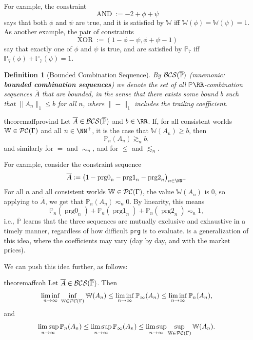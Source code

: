 \documentclass[authordate,onecolumn,noenvironments]{miri-tech-article}
\newtheorem{definition}[theorem]{Definition}
\numberwithin{equation}{subsection}
\newcommand{\seq}[1]{{\overline{#1}}}
\newcommand{\any}{-}
\newcommand{\nn}{n}
\newcommand{\pgenable}{\ensuremath{\MP}\text{-generable}\xspace}
\newcommand{\rparenthetical}[1]{\hfill\upshape{{\small (#1)}}} %
\newcommand{\proofin}[1]{\rparenthetical{Proof in:~#1.}}
\newcommand{\aff}{A}
\newcommand{\BCS}[1][\MP]{\mathcal{B\-C\-S}(#1)} %
\newcommand{\BelState}{\mathbb{P}}
\newcommand{\pt}{\BelState}
\newcommand{\MP}{\seq{\pt}}
\newcommand{\cworlds}{\mathcal{P\-C}} %
\newcommand{\World}{\mathbb{W}}
\newcommand{\Theory}{\Gamma}
\newcommand{\prgz}{\mathit{\operatorname{prg0}}}
\newcommand{\prgo}{\mathit{\operatorname{prg1}}}
\newcommand{\prgt}{\mathit{\operatorname{prg2}}}
\begin{document}
\noindent For example, the constraint
\[
  \operatorname{AND} := -2 + \phi + \psi
\]
says that both $\phi$ and $\psi$ are true, and it is satisfied by $\World$ iff $\World(\phi) = \World(\psi) = 1$. As another example, the pair of constraints
\[
  \operatorname{XOR} := (1 - \phi - \psi, \phi + \psi - 1)
\]
say that exactly one of $\phi$ and $\psi$ is true, and are satisfied by $\pt_7$ iff $\pt_7(\phi) + \pt_7(\psi) = 1$.

\begin{definition}[Bounded Combination Sequence]\label{def:bap}
  By $\BCS$ (mnemonic: \textbf{bounded combination sequences}) we denote the set of all \pgenable $\RR$-combination sequences $\seq{\aff}$ that are bounded, in the sense that there exists some bound $b$ such that $\| \aff_\nn \|_1 \le b$ for all $\nn$, where $\|\!\any\!\|_1$ includes the trailing coefficient.
\end{definition}

\begin{restatable}{theorem}{affprovind}\label{thm:affprovind}
  Let $\seq{\aff}\in\BCS$ and $b \in \RR$. If, for all consistent worlds $\World\in\cworlds(\Theory)$ and all $\nn \in \NN^+$, it is the case that $\World(\aff_n ) \ge b$, then
  \[
    \pt_\nn(\aff_\nn ) \gtrsim_\nn b,
  \]
  and similarly for $=$ and $\eqsim_\nn$, and for $\leq$ and $\lesssim_\nn$.
  \proofin{\ref{app:affprovind}}
\end{restatable}

For example, consider the constraint sequence
\[
    \seq{A} := \big(1 - \prgz_\nn - \prgo_\nn - \prgt_\nn\big)_{\nn \in \NN^+}
\]
For all $\nn$ and all consistent worlds $\World \in \cworlds(\Theory)$, the value $\World(A_\nn)$ is 0, so applying  to $\seq{A}$, we get that $\pt_\nn(A_\nn) \eqsim_\nn 0$. By linearity, this means
\[
  \pt_\nn(\prgz_\nn) + \pt_\nn(\prgo_\nn) + \pt_\nn(\prgt_\nn) \eqsim_\nn 1,
\]
i.e., $\MP$ learns that the three sequences are mutually exclusive and exhaustive in a timely manner, regardless of how difficult \texttt{prg} is to evaluate.  is a generalization of this idea, where the coefficients may vary (day by day, and with the market prices).

We can push this idea further, as follows:

\begin{restatable}{theorem}{affcoh}\label{thm:affcoh}
  Let $\seq{\aff}\in\BCS$. Then
  \[
    \liminf_{\nn\rightarrow\infty}\inf_{\World\in\cworlds(\Theory)}
      \World(\aff_\nn )
    \le \liminf_{\nn\rightarrow\infty}
      \pt_\infty(\aff_\nn )
    \le \liminf_{\nn\to\infty}
      \pt_\nn(\aff_\nn ),
  \]
  and
  \[
    \limsup_{\nn\to\infty} \pt_\nn(\aff_\nn )
    \le \limsup_{\nn\rightarrow\infty} \pt_\infty(\aff_\nn )
    \le \limsup_{\nn\rightarrow\infty} \sup_{\World\in\cworlds(\Theory)} 
      \World(\aff_\nn ).
   \]
  \proofin{\ref{app:affcoh}}
\end{restatable}
\end{document}
